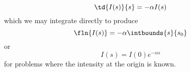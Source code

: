 \begin{equation}
  \td{I(s)}{s} = -\alpha I(s)
\end{equation}
which we may integrate directly to produce
\begin{equation*}
  \fln{I(s)} = -\alpha \intbounds{ s }{ s_{0} }
\end{equation*}
or
\begin{equation}
  I(s) = I(0) e^{-\alpha s}
\end{equation}
for problems where the intensity at the origin is known.

%

\endinput %
